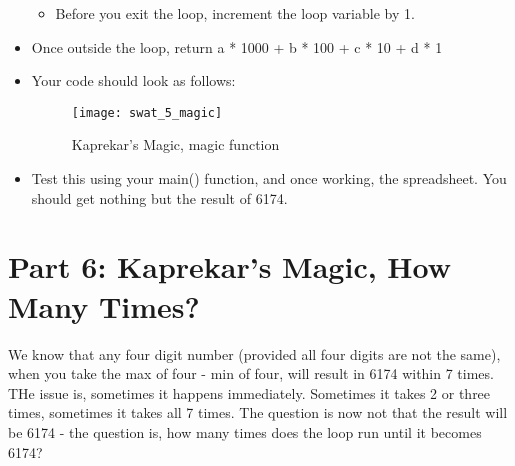 \documentclass{article}
\begin{document}
\begin{itemize}
\begin{itemize}
    		\item Before you exit the loop, increment the loop variable by 1.
    	\end{itemize}
    	\item Once outside the loop, return a * 1000 + b * 100 + c * 10 + d * 1
    	\item Your code should look as follows:
    	\begin{figure}[H]
  		\centering
  		\texttt{[image: swat\_5\_magic]}
  		\caption{Kaprekar's Magic, magic function}
	\end{figure}
    	\item Test this using your main() function, and once working, the spreadsheet.  You should get nothing but the result of 6174.
\end{itemize}

\section*{Part 6: Kaprekar's Magic, How Many Times?}
We know that any four digit number (provided all four digits are not the same), when you take the max of four - min of four, will result in 6174 within 7 times.  THe issue is, sometimes it happens immediately.  Sometimes it takes 2 or three times, sometimes it takes all 7 times.  The question is now not that the result will be 6174 - the question is, how many times does the loop run until it becomes 6174?
\end{document}
